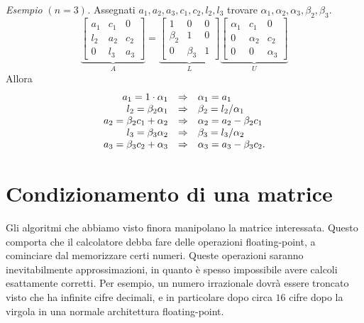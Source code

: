 \textit{Esempio }$( n=3)$\textit{. }Assegnati $a_{1} ,a_{2} ,a_{3} ,c_{1} ,c_{2} ,l_{2} ,l_{3}$ trovare $\alpha _{1} ,\alpha _{2} ,\alpha _{3} ,\beta _{2} ,\beta _{3}$.
\begin{equation*}
\underbrace{\begin{bmatrix}
a_{1} & c_{1} & 0\\
{l_{2}} & a_{2} & c_{2}\\
0 & l_{3} & a_{3}
\end{bmatrix}}_{A} =\underbrace{\begin{bmatrix}
1 & 0 & 0\\
\beta _{2} & 1 & 0\\
0 & \beta _{3} & 1
\end{bmatrix}}_{L}\underbrace{\begin{bmatrix}
\alpha _{1} & c_{1} & 0\\
0 & \alpha _{2} & c_{2}\\
0 & 0 & \alpha _{3}
\end{bmatrix}}_{U}
\end{equation*}
Allora
\begin{equation*}
\begin{array}{ r c l }
a_{1} =1\cdot \alpha _{1} & \Rightarrow  & \alpha _{1} =a_{1}\\
l_{2} =\beta _{2} \alpha _{1} & \Rightarrow  & \beta _{2} =l_{2} /\alpha _{1}\\
a_{2} =\beta _{2} c_{1} +\alpha _{2} & \Rightarrow  & \alpha _{2} =a_{2} -\beta _{2} c_{1}\\
l_{3} =\beta _{3} \alpha _{2} & \Rightarrow  & \beta _{3} =l_{3} /\alpha _{2}\\
a_{3} =\beta _{3} c_{2} +\alpha _{3} & \Rightarrow  & \alpha _{3} =a_{3} -\beta _{3} c_{2}.
\end{array}
\end{equation*}
\section{Condizionamento di una matrice}

Gli algoritmi che abbiamo visto finora manipolano la matrice interessata.
Questo comporta che il calcolatore debba fare delle operazioni floating-point, a cominciare dal memorizzare certi numeri.
Queste operazioni saranno inevitabilmente approssimazioni, in quanto è spesso impossibile avere calcoli esattamente corretti.
Per esempio, un numero irrazionale dovrà essere troncato visto che ha infinite cifre decimali, e in particolare dopo circa $16$ cifre dopo la virgola in una normale architettura floating-point.

